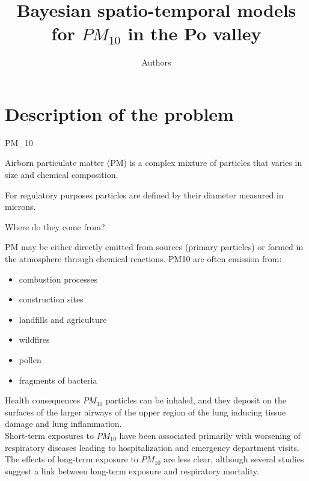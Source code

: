 \documentclass{beamer}
\title{Bayesian spatio-temporal models for $PM_{10}$ in the Po valley}
\author[Abbr]{Authors}
\institute{\textsc{Politecnico di Milano} \\
 
        
        { Arrigoni Francesca, Baracchi Federica, Cantalini Costanza, Ferrara Stefano, Gjyli Eno, Ursino Bruno  \\}
        
        }
\begin{document}
\section{Description of the problem}

\typesetFrontSlides


%
%


\begin{frame}{PM_{10}}

Airborn particulate matter (PM) is a complex mixture of particles that varies in size and chemical composition.

For regulatory purposes particles are defined by their diameter measured in microns.



\end{frame}


\begin{frame}{Where do they come from?}

PM may be either directly emitted from sources (primary particles) or formed in the atmosphere through chemical reactions.
PM10 are often emission from:
\begin{itemize}
    \item combustion processes
    \item construction sites
    \item landfills and agriculture
    \item wildfires
    \item pollen
    \item fragments of bacteria
\end{itemize}
    

\end{frame}

\begin{frame}{Health consequences}
$PM_{10}$ particles can be inhaled, and they deposit on the surfaces of the larger airways of the upper region of the lung inducing tissue damage and lung inflammation.\\
Short-term exposures to $PM_{10}$ have been associated primarily with worsening of respiratory diseases leading to hospitalization and emergency department visits.\\
The effects of long-term exposure to $PM_{10}$ are less clear, although several studies suggest a link between long-term  exposure and respiratory mortality. 

\end{frame}
\end{document}
